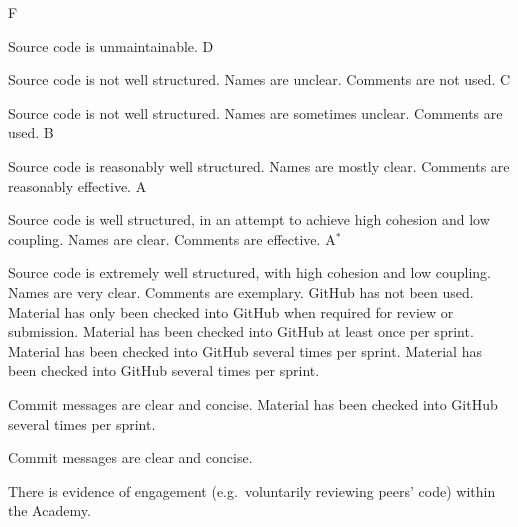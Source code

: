 \documentclass{../fal_assignment}
\begin{document}
\begin{markingrubric}
        \grade\fail F
            \par Source code is unmaintainable.
        \grade D
            \par Source code is not well structured.
                Names are unclear. Comments are not used.
        \grade C
            \par Source code is not well structured.
                Names are sometimes unclear. Comments are used.
        \grade B
            \par Source code is reasonably well structured.
                Names are mostly clear. Comments are reasonably effective.
        \grade A
            \par Source code is well structured, in an attempt to achieve high cohesion and low coupling.
                Names are clear. Comments are effective.
        \grade A$^*$
            \par Source code is extremely well structured, with high cohesion and low coupling.
                Names are very clear. Comments are exemplary.
        \grade\fail GitHub has not been used.
        \grade Material has only been checked into GitHub when required for review or submission.
        \grade Material has been checked into GitHub at least once per sprint.
        \grade Material has been checked into GitHub several times per sprint.
        \grade Material has been checked into GitHub several times per sprint.
            \par Commit messages are clear and concise.
        \grade Material has been checked into GitHub several times per sprint.
            \par Commit messages are clear and concise.
            \par There is evidence of engagement (e.g.\ voluntarily reviewing peers' code)
                within the Academy.
\end{markingrubric}
\end{document}
